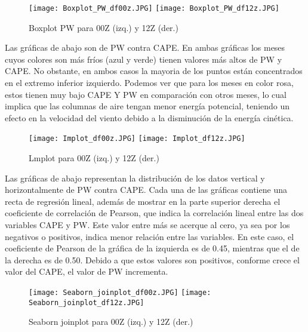 \documentclass[a4paper]{article}
\begin{document}
\begin{figure}[!ht]
\centering 
\texttt{[image: Boxplot\_PW\_df00z.JPG]}
\texttt{[image: Boxplot\_PW\_df12z.JPG]}
\caption{Boxplot PW para 00Z (izq.) y 12Z (der.)}
\end{figure}


\newpage

Las gráficas de abajo son de PW contra CAPE. En ambas gráficas los meses cuyos colores son más fríos (azul y verde) tienen valores más altos de PW y CAPE. 
No obstante, en ambos casos la mayoria de los puntos están concentrados en el extremo inferior izquierdo.
Podemos ver que para los meses en color rosa, estos tienen muy bajo CAPE Y PW en comparación con otros meses, lo cual implica que las columnas de aire tengan menor energía potencial, teniendo un efecto en la velocidad del viento debido a la disminución de la energía cinética.



\begin{figure}[h!]
\centering 
\texttt{[image: Implot\_df00z.JPG]}
\texttt{[image: Implot\_df12z.JPG]}
\caption{Lmplot para 00Z (izq.) y 12Z (der.)}
\end{figure}



Las gráficas de abajo representan la distribución de los datos vertical y horizontalmente de PW contra CAPE. Cada una de las gráficas contiene una recta de regresión lineal, además de mostrar en la parte superior derecha el coeficiente de correlación de Pearson, que indica la correlación lineal entre las dos variables CAPE y PW. Este valor entre más se acerque al cero, ya sea por los negativos o positivos, indica menor relación entre las variables. En este caso, el coeficiente de Pearson de la gráfica de la izquierda es de 0.45, mientras que el de la derecha es de 0.50. Debido a que estos valores son positivos, conforme crece el valor del CAPE, el valor de PW incrementa.





\begin{figure}[h!]
\centering 
\texttt{[image: Seaborn\_joinplot\_df00z.JPG]}
\texttt{[image: Seaborn\_joinplot\_df12z.JPG]}
\caption{Seaborn joinplot para 00Z (izq.) y 12Z (der.)}
\end{figure}

\newpage
\end{document}
